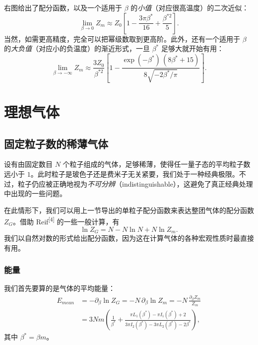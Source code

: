 右图给出了配分函数，以及一个适用于 $\beta$ 的\emph{小值}（对应很高温度）的二次近似：
\begin{equation}
\lim_{\beta\to0}Z_{m}\approx Z_{0}\left[1-\frac{3\pi\beta^{*}}{16}+\frac{\beta^{*2}}{5}\right].
\end{equation}
当然，如需更高精度，完全可以把幂级数取到更高阶。此外，还有一个适用于 $\beta$ 的\emph{大负值}（对应小的负温度）的渐近形式，一旦 $\beta^{*}$ 足够大就开始有用：
\begin{equation}
\lim_{\beta\to-\infty}Z_{m}\approx
\frac{3Z_{0}}{\beta^{*2}}\left[1-\frac{\exp(-\beta^{*})\,(8\beta^{*}+15)}{8\sqrt{-2\beta^{*}/\pi}}\right].
\end{equation}

\section{理想气体}

\subsection{固定粒子数的稀薄气体}

设有由固定数目 $N$ 个粒子组成的气体，足够稀薄，使得任一量子态的平均粒子数远小于 $1$。此时粒子是玻色子还是费米子无关紧要，我们处于一种经典极限。不过，粒子仍应被正确地视为\emph{不可分辨}（indistinguishable），这避免了真正经典处理中出现的一些问题。

在此情形下，我们可以用上一节导出的单粒子配分函数来表达整团气体的配分函数 $Z_{G}$。借助 Reif\textsuperscript{[4]} 的一些一般计算，有
\begin{equation}
\ln Z_{G}=N-N\ln N+N\ln Z_{m}.
\end{equation}
我们以自然对数的形式给出配分函数，因为这在计算气体的各种宏观性质时最直接有用。

\subsubsection{能量}

我们首先要算的是气体的平均能量：
\begin{align}
E_{mean}
&=-\partial_{\beta}\ln Z_{G}
=-N\,\partial_{\beta}\ln Z_{m}
=-N\,\frac{\partial_{\beta}Z_{m}}{Z_{m}} \nonumber\\
&=3Nm\left(\frac{1}{\beta^{*}}+
\frac{\pi L_{1}(\beta^{*})-\pi I_{1}(\beta^{*})+2}
{3\pi I_{2}(\beta^{*})-3\pi L_{2}(\beta^{*})-2\beta^{*}}\right),
\end{align}
其中 $\beta^{*}=\beta m$。

